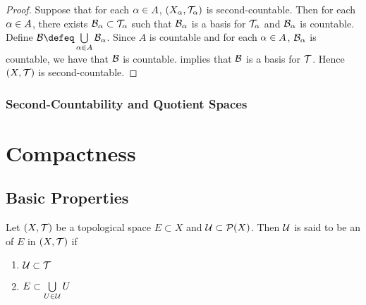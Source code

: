 \documentclass{book}
\begin{document}
	\begin{proof}
		Suppose that for each $\alpha \in A$, $(X_{\alpha}, \mathcal{T}_{\alpha})$ is second-countable. Then for each $\alpha \in A$, there exists $\mathcal{B}_{\alpha} \subset \mathcal{T}_{\alpha}$ such that $\mathcal{B}_{\alpha}$ is a basis for $\mathcal{T}_{\alpha}$ and $\mathcal{B}_{\alpha}$ is countable. Define $\MB \defeq \bigcup\limits_{\al \in A} \MB_{\al}$. Since $A$ is countable and for each $\alpha \in A$, $\mathcal{B}_{\alpha}$ is countable, we have that $\mathcal{B}$ is countable.  implies that $\mathcal{B}$ is a basis for $\mathcal{T}$. Hence $(X, \mathcal{T})$ is second-countable. 
	\end{proof}










































	\subsubsection{Second-Countability and Quotient Spaces}

	
	
	
	
	
	
	
	
	
	
	
	
	
	
	
	\newpage
	\section{Compactness}
	
	\subsection{Basic Properties}
	
	\begin{defn} 
		Let $(X, \mathcal{T})$ be a topological space $E \subset X$ and $\mathcal{U} \subset \mathcal{P}(X)$. Then $\mathcal{U}$ is said to be an  of $E$ in $(X, \mathcal{T})$ if 
		\begin{enumerate}
			\item $\mathcal{U} \subset \mathcal{T}$ 
			\item $E \subset \bigcup\limits_{U \in \mathcal{U}} U$
		\end{enumerate}
	\end{defn}
\end{document}
